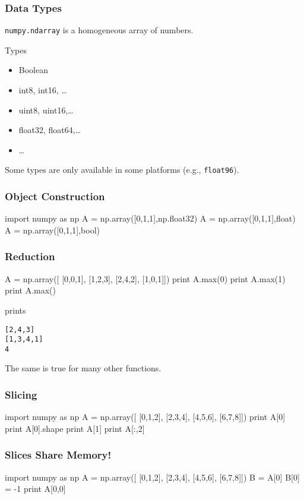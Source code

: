 \begin{frame}[fragile]
\frametitle{Data Types}

\lstinline{numpy.ndarray} is a homogeneous array of numbers.

\begin{block}{Types}
\begin{itemize}
\item Boolean
\item int8, int16, \ldots
\item uint8, uint16,\ldots
\item float32, float64,\ldots
\item \ldots
\end{itemize}
\end{block}

Some types are only available in some platforms (e.g., \lstinline{float96}).

\end{frame}

\begin{frame}[fragile]
\frametitle{Object Construction}

\begin{python}
import numpy as np
A = np.array([0,1,1],np.float32)
A = np.array([0,1,1],float)
A = np.array([0,1,1],bool)
\end{python}
\end{frame}

\begin{frame}[fragile]
\frametitle{Reduction}

\begin{python}
A = np.array([
    [0,0,1],
    [1,2,3],
    [2,4,2],
    [1,0,1]])
print A.max(0)
print A.max(1)
print A.max()
\end{python}
prints
\begin{verbatim}
[2,4,3]
[1,3,4,1]
4
\end{verbatim}

The same is true for many other functions.
\end{frame}

\begin{frame}[fragile]
\frametitle{Slicing}

\begin{python}
import numpy as np
A = np.array([
    [0,1,2],
    [2,3,4],
    [4,5,6],
    [6,7,8]])
print A[0]
print A[0].shape
print A[1]
print A[:,2]
\end{python}
\end{frame}

\begin{frame}[fragile]
\frametitle{Slices Share Memory!}
\begin{python}
import numpy as np
A = np.array([
    [0,1,2],
    [2,3,4],
    [4,5,6],
    [6,7,8]])
B = A[0]
B[0] = -1
print A[0,0]
\end{python}

\end{frame}


